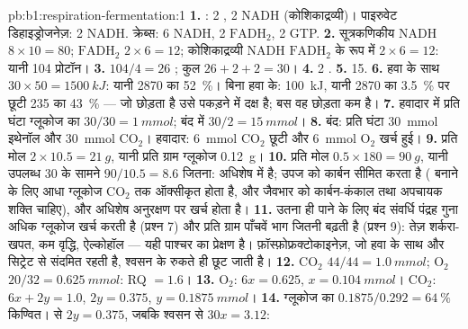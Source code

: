 \begin{solution}{pb:b1:respiration-fermentation:1}
\textbf{1.} : 2 , 2 NADH (कोशिकाद्रव्यी)। पाइरुवेट
डिहाइड्रोजनेज़: 2 NADH. क्रेब्स: 6 NADH, 2 $\mathrm{FADH_2}$, 2 GTP.
\textbf{2.} सूत्रकणिकीय NADH $8\times 10 = 80$; $\mathrm{FADH_2}$
$2\times 6 = 12$; कोशिकाद्रव्यी NADH $\mathrm{FADH_2}$ के रूप में $2\times 6 = 12$:
यानी 104 प्रोटॉन।
\textbf{3.} $104/4 = 26$ ; कुल $26 + 2 + 2 = 30$।
\textbf{4.} 2 .
\textbf{5.} 15.
\textbf{6.} हवा के साथ $30\times 50 = \qty{1500}{kJ}$: यानी 2870 का
\qty{52}{\%}। बिना हवा के: \qty{100}{kJ}, यानी 2870 का \qty{3.5}{\%} पर
छूटी 235 का \qty{43}{\%} ---  जो छोड़ता है उसे पकड़ने में दक्ष है;
बस वह छोड़ता कम है।
\textbf{7.} हवादार में प्रति घंटा ग्लूकोज का $30/30 = \qty{1}{mmol}$; बंद
में $30/2 = \qty{15}{mmol}$।
\textbf{8.} बंद: प्रति घंटा \qty{30}{mmol} इथेनॉल और \qty{30}{mmol}
$\mathrm{CO_2}$। हवादार: \qty{6}{mmol} $\mathrm{CO_2}$
छूटी और \qty{6}{mmol} $\mathrm{O_2}$ खर्च हुई।
\textbf{9.} प्रति मोल $2\times 10.5 = \qty{21}{g}$, यानी प्रति ग्राम
ग्लूकोज \qty{0.12}{g}।
\textbf{10.} प्रति मोल $0.5\times 180 = \qty{90}{g}$, यानी उपलब्ध 30 के
सामने $90/10.5 =
8.6$  जितना:  अधिशेष में है; उपज को कार्बन सीमित
करता है ( बनाने के लिए आधा ग्लूकोज $\mathrm{CO_2}$ तक ऑक्सीकृत होता है,
और जैवभार को कार्बन-कंकाल तथा अपचायक शक्ति चाहिए), और अधिशेष 
अनुरक्षण पर खर्च होता है।
\textbf{11.} उतना ही  पाने के लिए बंद संवर्धि पंद्रह गुना अधिक
ग्लूकोज खर्च करती है (प्रश्न 7) और प्रति ग्राम पाँचवें भाग जितनी बढ़ती है
(प्रश्न 9): तेज़ शर्करा-खपत, कम वृद्धि, ऐल्कोहॉल ---
यही पाश्चर का प्रेक्षण है। फ़ॉस्फ़ोफ्रक्टोकाइनेज़, जो हवा के साथ  और
सिट्रेट से संदमित रहती है, श्वसन के रुकते ही छूट जाती है।
\textbf{12.} $\mathrm{CO_2}$ $44/44 = \qty{1.0}{mmol}$; $\mathrm{O_2}$
$20/32 = \qty{0.625}{mmol}$: RQ $= 1.6$।
\textbf{13.} $\mathrm{O_2}$: $6x = 0.625$, $x = \qty{0.104}{mmol}$।
$\mathrm{CO_2}$: $6x + 2y = 1.0$, $2y = 0.375$, $y = \qty{0.1875}{mmol}$।
\textbf{14.} ग्लूकोज का $0.1875/0.292 = \qty{64}{\%}$ किण्वित।  से
 $2y = 0.375$, जबकि श्वसन से $30x = 3.12$:

\end{solution}
